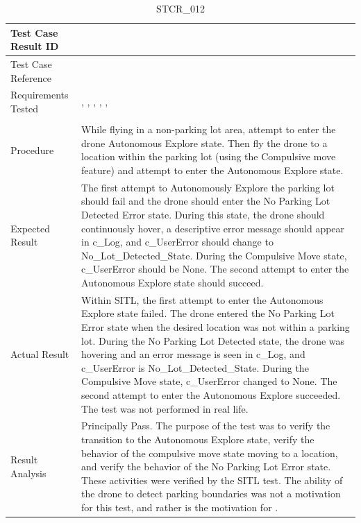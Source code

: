\documentclass[12pt, titlepage]{article}
\begin{document}
\begin{table}[!h]
\begin{center}
\caption {STCR\_012}
\label{tab:STCR_012}
\begin{tabular}{ | m{3.2cm} | m{12.2cm} | } 
\hline
Test Case Result ID & \nameref{tab:STCR_012} \\ 
\hline
Test Case Reference & \nameref{tab:STC_012}  \\ 
\hline
Requirements Tested & \nameref{STA_003}, \nameref{TRANS_004}, \nameref{STA_011}, \nameref{TRANS_012}, \nameref{STA_008}, \nameref{TRANS_008} \\ 

\\ 
\hline
Procedure & While flying in a non-parking lot area, attempt to enter the drone Autonomous Explore state. Then fly the drone to a location within the parking lot (using the Compulsive move feature) and attempt to enter the Autonomous Explore state.     \\
\hline
Expected Result & The first attempt to Autonomously Explore the parking lot should fail and the drone should enter the No Parking Lot Detected Error state. During this state, the drone should continuously hover, a descriptive error message should appear in c\_Log, and c\_UserError should change to No_Lot_Detected_State. During the Compulsive Move state, c_UserError should be None. The second attempt to enter the Autonomous Explore state should succeed.   \\ 
\hline
Actual Result & Within SITL, the first attempt to enter the Autonomous Explore state failed. The drone entered the No Parking Lot Error state when the desired location was not within a parking lot. During the No Parking Lot Detected state, the drone was hovering and an error message is seen in c\_Log, and c\_UserError is No_Lot_Detected_State. During the Compulsive Move state, c_UserError changed to None. The second attempt to enter the Autonomous Explore succeeded. The test was not performed in real life.  \\
\hline
Result Analysis & Principally Pass. The purpose of the test was to verify the transition to the Autonomous Explore state, verify the behavior of the compulsive move state moving to a location, and verify the behavior of the No Parking Lot Error state. These activities were verified by the SITL test. The ability of the drone to detect parking boundaries was not a motivation for this test, and rather is the motivation for \nameref{tab:STC_014}.   \\ 
\hline
\end{tabular}
\end{center}
\end{table}
\end{document}
